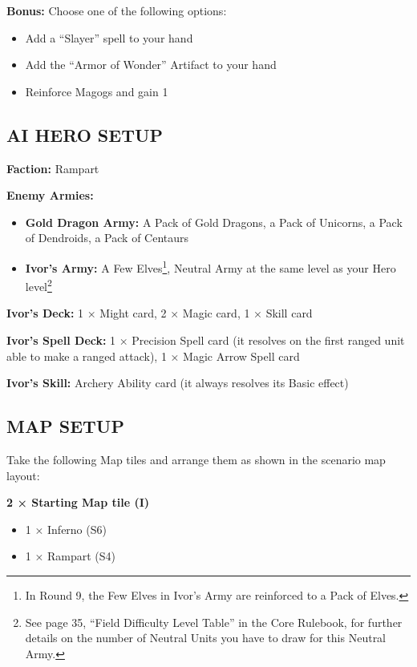 \begin{multicols*}{2}
\textbf{Bonus:} Choose one of the following options:
\begin{itemize}
  \item Add a ``Slayer'' spell to your hand
  \item Add the ``Armor of Wonder'' Artifact to your hand
  \item Reinforce Magogs and gain 1 
\end{itemize}

\subsection*{\MakeUppercase{AI hero setup}}

\textbf{Faction:} Rampart

\textbf{Enemy Armies:}

\begin{itemize}
  \item \textbf{Gold Dragon Army:} A Pack of Gold Dragons, a Pack of Unicorns, a Pack of Dendroids, a Pack of Centaurs
  \item \textbf{Ivor's Army:} A Few Elves\footnote{In Round 9, the Few Elves in Ivor's Army are reinforced to a Pack of Elves.}, Neutral Army at the same level as your Hero level\footnote{See page 35, ``Field Difficulty Level Table'' in the Core Rulebook, for further details on the number of Neutral Units you have to draw for this Neutral Army.}
\end{itemize}

\textbf{Ivor's Deck:} 1 × Might card, 2 × Magic card, 1 × Skill card

\textbf{Ivor's Spell Deck:} 1 × Precision Spell card (it resolves on the first ranged unit able to make a ranged attack), 1 × Magic Arrow Spell card

\textbf{Ivor's Skill:} Archery Ability card (it always resolves its Basic effect)

\subsection*{\MakeUppercase{Map setup}}

Take the following Map tiles and arrange them as shown in the scenario map layout:

\textbf{2 × Starting Map tile (I)}
\begin{itemize}
  \item 1 × Inferno (S6)
  \item 1 × Rampart (S4)
\end{itemize}


\end{multicols*}
